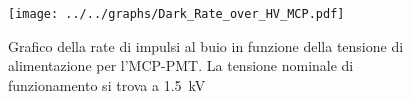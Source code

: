 \begin{figure}[h] \centering \texttt{[image: ../../graphs/Dark\_Rate\_over\_HV\_MCP.pdf]}\caption{Grafico della rate di impulsi al buio in funzione della tensione di alimentazione per l'MCP-PMT. La tensione nominale di funzionamento si trova a \SI{1.5}{\kilo\volt}}\label{gr:Dark_Rate_over_HV_MCP} \end{figure}
